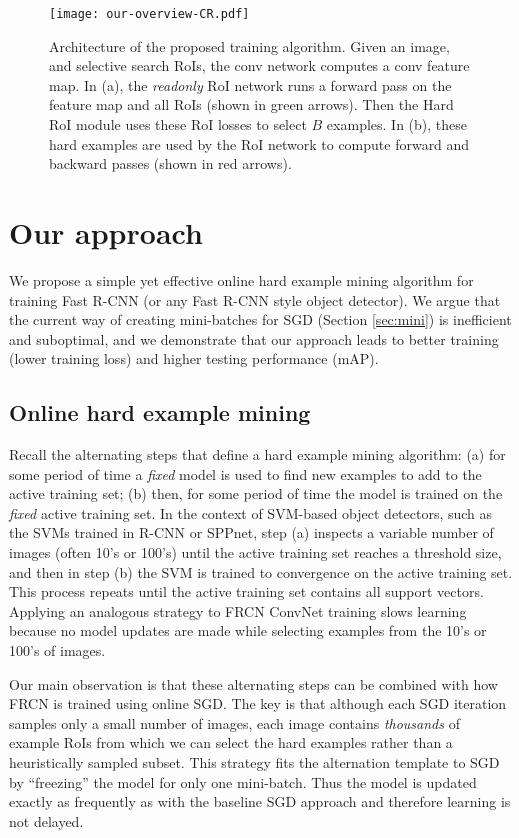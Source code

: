 \documentclass[10pt,twocolumn,letterpaper]{article}
\begin{document}
\begin{figure*}[t]
	\centering
	\texttt{[image: our-overview-CR.pdf]}
	\vspace{-0.25in}
  \caption[caption]{Architecture of the proposed training algorithm. Given an image, and selective search RoIs, the conv network computes a conv feature map. In (a), the \protect\emph{readonly} RoI network runs a forward pass on the feature map and all RoIs (shown in {\protect\color{green}green} arrows). Then the Hard RoI module uses these RoI losses to select $B$ examples. In (b), these hard examples are used by the RoI network to compute forward and backward passes (shown in {\protect\color{red}red} arrows).}
\vspace{-0.2in}
	\label{fig:overview}
\end{figure*}

\section{Our approach}
We propose a simple yet effective online hard example mining algorithm for training Fast R-CNN (or any Fast R-CNN style object detector). We argue that the current way of creating mini-batches for SGD (Section \ref{sec:mini}) is inefficient and suboptimal, and we demonstrate that our approach leads to better training (lower training loss) and higher testing performance (mAP).

\subsection{Online hard example mining}\label{sec:ohem}
Recall the alternating steps that define a hard example mining algorithm: (a) for some period of time a \emph{fixed} model is used to find new examples to add to the active training set; (b) then, for some period of time the model is trained on the \emph{fixed} active training set. In the context of SVM-based object detectors, such as the SVMs trained in R-CNN or SPPnet, step (a) inspects a variable number of images (often 10's or 100's) until the active training set reaches a threshold size, and then in step (b) the SVM is trained to convergence on the active training set. This process repeats until the active training set contains all support vectors. Applying an analogous strategy to FRCN ConvNet training slows learning because no model updates are made while selecting examples from the 10's or 100's of images.

Our main observation is that these alternating steps can be combined with how FRCN is trained using online SGD. The key is that although each SGD iteration samples only a small number of images, each image contains \emph{thousands} of example RoIs from which we can select the hard examples rather than a heuristically sampled subset. This strategy fits the alternation template to SGD by ``freezing'' the model for only one mini-batch. Thus the model is updated exactly as frequently as with the baseline SGD approach and therefore learning is not delayed.
\end{document}
